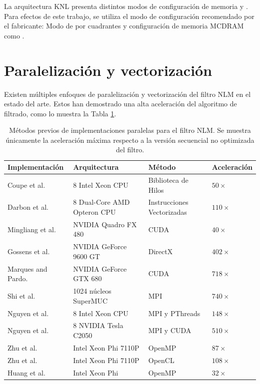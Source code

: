 {La arquitectura KNL presenta distintos modos de configuraci\'on de memoria y . Para efectos de este trabajo, se utiliza el modo de configuraci\'on recomendado por el fabricante: Modo de  por cuadrantes y configuraci\'on de memoria MCDRAM como .


\section{Paralelizaci\'on y vectorizaci\'on}
\label{ch:marco_parallel}

Existen m\'ultiples enfoques de paralelizaci\'on y vectorizaci\'on del filtro NLM en el estado del arte. Estos han demostrado una alta aceleraci\'on del algoritmo de filtrado, como lo muestra la Tabla \ref{method_table}. 


\begin{table}
\caption[Estado del arte en paralelizaciones del filtro NLM]{M\'etodos previos de implementaciones paralelas para el filtro NLM. Se muestra \'unicamente la aceleraci\'on m\'axima respecto a la versi\'on secuencial no optimizada del filtro.}
\begin{tabularx}{1\linewidth}{X X X X} 
\hline
Implementaci\'on & Arquitectura & M\'etodo & Aceleraci\'on \\ [0.5ex]
 \hline\hline
 Coupe et al. \cite{coupe2006fast} &  8 Intel Xeon CPU & Biblioteca de Hilos & $50\times$\\
 Darbon et al. \cite{Darbon2008} &  8 Dual-Core AMD Opteron CPU & Instrucciones Vectorizadas & $110\times$\\
 Mingliang et al. \cite{mingliang2016medical} &  NVIDIA Quadro FX 480 & CUDA & $40\times$\\
Gossens et al. \cite{goossens2010gpu} &  NVIDIA GeForce 9600 GT & DirectX & $402\times$\\
Marques and Pardo. \cite{marques2013implementation} &  NVIDIA GeForce GTX 680 & CUDA & $718\times$\\ 
Shi et al. \cite{shi2015optimized} &   1024 n\'ucleos SuperMUC & MPI & $740\times$\\
Nguyen et al. \cite{nguyen2016medical} &   8 Intel Xeon CPU & MPI y PThreads & $148\times$\\
Nguyen et al. \cite{nguyen2016medical} &   8 NVIDIA Tesla C2050 & MPI y CUDA & $510\times$\\
Zhu et al. \cite{zhu2016parallel} &  Intel Xeon Phi 7110P & OpenMP & $87\times$\\
Zhu et al. \cite{zhu2016parallel} &  Intel Xeon Phi 7110P & OpenCL & $108\times$\\
Huang et al. \cite{huang2017parallel} &  Intel Xeon Phi & OpenMP & $32\times$\\
\end{tabularx}
\label{method_table}
\end{table}

}
